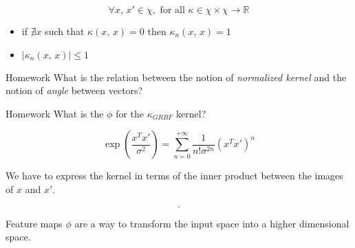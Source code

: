 \begin{note}
	\begin{equation*}
		\forall x,\,x' \in \chi, \text{ for all } \kappa
		\in \chi \times \chi \to \mathds R
	\end{equation*}
	\begin{itemize}
		\item if $\nexists x$ such that $\kappa(x,\,x) = 0$ then
		      $\kappa_n(x,\,x) = 1$
		\item $\left| \kappa_n(x,\,x) \right| \leq 1$
	\end{itemize}
\end{note}

\begin{exercise}{Homework}{}
	What is the relation between the notion of \emph{normalized kernel}
	and the notion of \emph{angle} between vectors?
\end{exercise}

\begin{exercise}{Homework}{}
	What is the $\phi$ for the $\kappa_{GRBF}$ kernel?

	\begin{hint}
		\begin{equation*}
			\exp\left(
			\frac{x^Tx'}{\sigma^2}
			\right) = \sum_{n=0}^{+\infty} \frac{1}{n!\sigma^{2n}} (x^Tx')^n
		\end{equation*}

    We have to express the kernel in terms of the inner product
    between the images of $x$ and $x'$.
	\end{hint}

	\tcblower

	\begin{equation*}
    .
	\end{equation*}
\end{exercise}

\begin{note}
  Feature maps $\phi$ are a way to transform the input space into a
  higher dimensional space.
\end{note}
